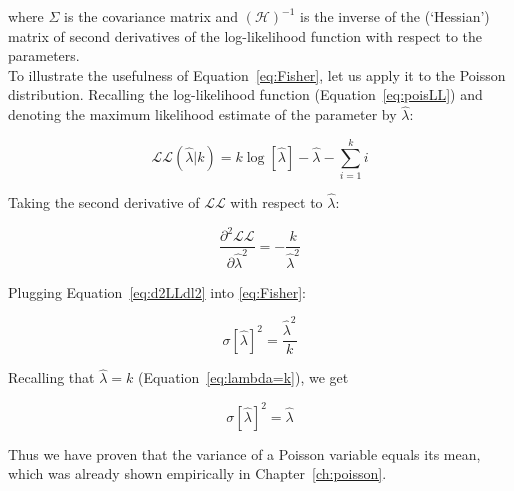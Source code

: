 \noindent where $\Sigma$ is the covariance matrix and
$(\mathcal{H})^{-1}$ is the inverse of the (`Hessian') matrix of
second derivatives of the log-likelihood function with respect to the
parameters.\\

To illustrate the usefulness of Equation~\ref{eq:Fisher}, let us apply
it to the Poisson distribution.  Recalling the log-likelihood function
(Equation~\ref{eq:poisLL}) and denoting the maximum likelihood
estimate of the parameter by $\hat{\lambda}$:

\[
\mathcal{LL}(\hat{\lambda}|k) =
k \log[\hat{\lambda}] - \hat{\lambda} - \sum\limits_{i=1}^{k}i
\]

Taking the second derivative of $\mathcal{LL}$ with respect to
$\hat{\lambda}$:

\begin{equation}
  \frac{\partial^2{\mathcal{LL}}}{\partial{\hat{\lambda}^2}} =
  -\frac{k}{\hat{\lambda}^2}
  \label{eq:d2LLdl2}
\end{equation}

Plugging Equation~\ref{eq:d2LLdl2} into \ref{eq:Fisher}:

\[
  \sigma[\hat{\lambda}]^2 = \frac{\hat{\lambda}^2}{k}
\]

Recalling that $\hat{\lambda} = k$ (Equation~\ref{eq:lambda=k}), we
get

\begin{equation}
  \sigma[\hat{\lambda}]^2 = \hat{\lambda}
  \label{eq:poisvar}
\end{equation}

Thus we have proven that the variance of a Poisson variable equals its
mean, which was already shown empirically in Chapter~\ref{ch:poisson}.
